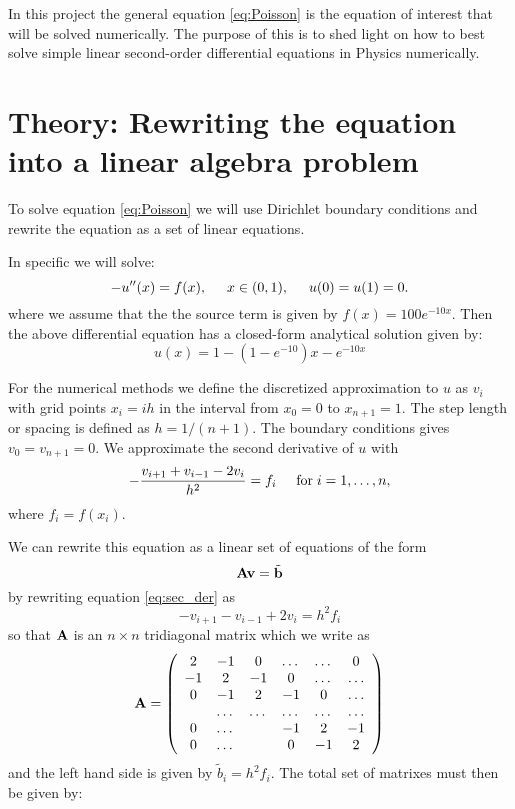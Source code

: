 \documentclass[11pt,a4wide]{article}
\begin{document}
In this project the general equation \ref{eq:Poisson} is the equation of interest that will be solved numerically. The purpose of this is to shed light on how to best solve simple linear second-order differential equations in Physics numerically. 

\section{Theory: Rewriting the equation into a linear algebra problem}
To solve equation \ref{eq:Poisson} we will use Dirichlet boundary conditions and rewrite the equation as a set of linear equations.

In specific we will solve:
\[
-u''(x) = f(x), \hspace{0.5cm} x\in(0,1), \hspace{0.5cm} u(0) = u(1) = 0.
\]
where we assume that the the source term is given by $f(x) = 100e^{-10x}$.  Then the above differential equation
has a closed-form analytical solution given by:
\begin{equation}
u(x) = 1-(1-e^{-10})x-e^{-10x}
\label{eq:analytical_sol}
\end{equation}

For the numerical methods we define the discretized approximation  to $u$ as $v_i$  with grid points $x_i=ih$ in the interval from $x_0=0$ to $x_{n+1}=1$.
The step length or spacing is defined as $h=1/(n+1)$. The boundary conditions gives $v_0 = v_{n+1} = 0$.
We  approximate the second derivative of $u$ with 
\begin{equation}
-\frac{v_{i+1}+v_{i-1}-2v_i}{h^2} = f_i  \hspace{0.5cm} \mathrm{for} \hspace{0.1cm} i=1,\dots, n,
\label{eq:sec_der}
\end{equation}
where $f_i=f(x_i)$.

We can rewrite this equation as a linear set of equations of the form 
\begin{equation}
   {\bf A}{\bf v} = \tilde{{\bf b}}
   \label{eq:linear_eq}
\end{equation}
by rewriting equation \ref{eq:sec_der} as
\[  
   -v_{i+1}-v_{i-1}+2v_i = h^2f_i
\]
so that ${\bf A}$ is an $n\times n$  tridiagonal matrix which we write as 
\begin{equation}
    {\bf A} = \left(\begin{array}{cccccc}
                           2& -1& 0 &\dots   & \dots &0 \\
                           -1 & 2 & -1 &0 &\dots &\dots \\
                           0&-1 &2 & -1 & 0 & \dots \\
                           & \dots   & \dots &\dots   &\dots & \dots \\
                           0&\dots   &  &-1 &2& -1 \\
                           0&\dots    &  & 0  &-1 & 2 \\
                      \end{array} \right)
\end{equation}
and the left hand side is given by $\tilde{b}_i=h^2f_i$. The total set of matrixes must then be given by:
\end{document}
